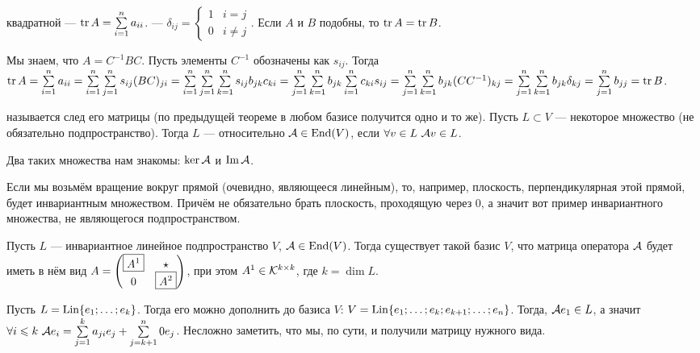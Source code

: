 \documentclass{article}
\DeclareMathOperator{\operIm}{Im}
\let\Im\operIm
\begin{document}
\begin{itemize}
\begin{Example}
\begin{enumerate}
            \end{enumerate}
        \end{Example}
        \dfn {} квадратной  --- $\operatorname{tr} A=\sum\limits_{i=1}^na_{ii}$.
        \dfn {} --- $\delta_{ij}=\begin{cases}
            1 & i=j\\
            0 & i\neq j
        \end{cases}$.
        \thm Если $A$ и $B$ подобны, то $\operatorname{tr} A=\operatorname{tr} B$.
        \begin{Proof}
            Мы знаем, что $A=C^{-1}BC$. Пусть элементы $C^{-1}$ обозначены как $s_{ij}$. Тогда $\operatorname{tr} A=\sum\limits_{i=1}^na_{ii}=\sum\limits_{i=1}^n\sum\limits_{j=1}^ns_{ij}(BC)_{ji}=\sum\limits_{i=1}^n\sum\limits_{j=1}^n\sum\limits_{k=1}^ns_{ij}b_{jk}c_{ki}=\sum\limits_{j=1}^n\sum\limits_{k=1}^nb_{jk}\sum\limits_{i=1}^nc_{ki}s_{ij}=\sum\limits_{j=1}^n\sum\limits_{k=1}^nb_{jk}(CC^{-1})_{kj}=\sum\limits_{j=1}^n\sum\limits_{k=1}^nb_{jk}\delta_{kj}=\sum\limits_{j=1}^nb_{jj}=\operatorname{tr} B$. 
        \end{Proof}
        \dfn {} называется след его матрицы (по предыдущей теореме в любом базисе получится одно и то же).
        \dfn Пусть $L\subset V$ --- некоторое множество (не обязательно подпространство). Тогда $L$ ---   относительно ${\mathcal{A}}\in\operatorname{End}(V)$, если $\forall v\in L~{\mathcal{A}} v\in L$.
        \begin{Example}
            Два таких множества нам знакомы: $\ker{\mathcal{A}}$ и $\Im\scriptA$.
        \end{Example}
        \begin{Example}
            Если мы возьмём вращение вокруг прямой (очевидно, являющееся линейным), то, например, плоскость, перпендикулярная этой прямой, будет инвариантным множеством. Причём не обязательно брать плоскость, проходящую через 0, а значит вот пример инвариантного множества, не являющегося подпространством.
        \end{Example}
        \thm Пусть $L$ --- инвариантное линейное подпространство $V$, ${\mathcal{A}}\in\operatorname{End}(V)$. Тогда существует такой базис $V$, что матрица оператора ${\mathcal{A}}$ будет иметь в нём вид $A=\left(\begin{matrix}\boxed{A^1} & \star\\0 & \boxed{A^2}\end{matrix}\right)$, при этом $A^1\in{\mathcal{K}}^{k\times k}$, где $k=\dim L$.
        \begin{Proof}
            Пусть $L=\operatorname{Lin}\{e_1;\ldots;e_k\}$. Тогда его можно дополнить до базиса $V$: $V=\operatorname{Lin}\{e_1;\ldots;e_k;e_{k+1};\ldots;e_n\}$. Тогда, ${\mathcal{A}} e_1\in L$, а значит $\forall i\leqslant k~{\mathcal{A}} e_i=\sum\limits_{j=1}^ka_{ji}e_j+\sum\limits_{j=k+1}^n0e_j$. Несложно заметить, что мы, по сути, и получили матрицу нужного вида.

\end{Proof}
\end{itemize}
\end{document}
